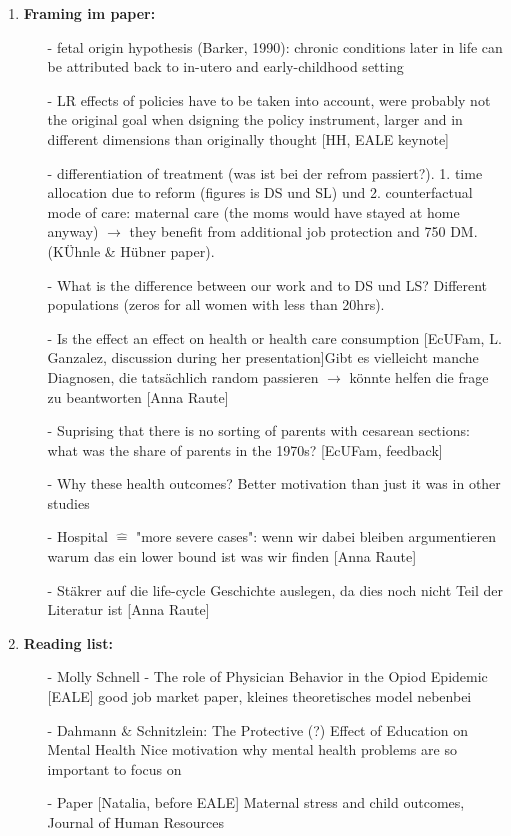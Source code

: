 \documentclass[11pt,a4paper]{article}
\begin{document}
{\begin{enumerate}
\item \textbf{Framing im paper:} \vspace{-1em}
\begin{itemize}
\item[-] fetal origin hypothesis (Barker, 1990): chronic conditions later in life can be attributed back to in-utero and early-childhood setting
\item[-] LR effects of policies have to be taken into account, were probably not the original goal when dsigning the policy instrument, larger and in different dimensions than originally thought [HH, EALE keynote]
\item[-] differentiation of treatment (was ist bei der refrom passiert?). 1. time allocation due to reform (figures is DS und SL) und 2. counterfactual mode of care: maternal care (the moms would have stayed at home anyway) $\rightarrow$ they benefit from additional job protection and 750 DM.
(KÜhnle \& Hübner paper).
\item[-] What is the difference between our work and to DS und LS? Different populations (zeros for all women with less than 20hrs).
\item[-] Is the effect an effect on health or health care consumption [EcUFam, L. Ganzalez, discussion during her presentation]\newline Gibt es vielleicht manche Diagnosen, die tatsächlich random passieren $\rightarrow$ könnte helfen die frage zu beantworten [Anna Raute]
\item[-] Suprising that there is no sorting of parents with cesarean sections: what was the share of parents in the 1970s? [EcUFam, feedback]
\item[-] Why these health outcomes? Better motivation than just it was in other studies
\item[-] Hospital $\mathrel{\widehat{=}}$ "more severe cases": wenn wir dabei bleiben argumentieren warum das ein lower bound ist was wir finden [Anna Raute]
\item[-] Stäkrer auf die life-cycle Geschichte auslegen, da dies noch nicht Teil der Literatur ist [Anna Raute]
\end{itemize}

\item \textbf{Reading list:}
\begin{itemize}
\item[-] Molly Schnell - The role of Physician Behavior in the Opiod Epidemic [EALE]\newline
good job market paper, kleines theoretisches model nebenbei
\item[-]  Dahmann \& Schnitzlein: The Protective (?) Effect of Education on Mental Health   \newline
 Nice motivation why mental health problems are so important to focus on 
 \item[-] Paper [Natalia, before EALE] Maternal stress and child outcomes, Journal of Human Resources


\end{itemize}
\end{enumerate}}
\end{document}
